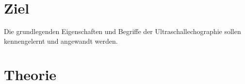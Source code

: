 \section{Ziel}

Die grundlegenden Eigenschaften und Begriffe der Ultraschallechographie sollen kennengelernt und angewandt werden. 

\section{Theorie}
\label{sec:Theorie}


